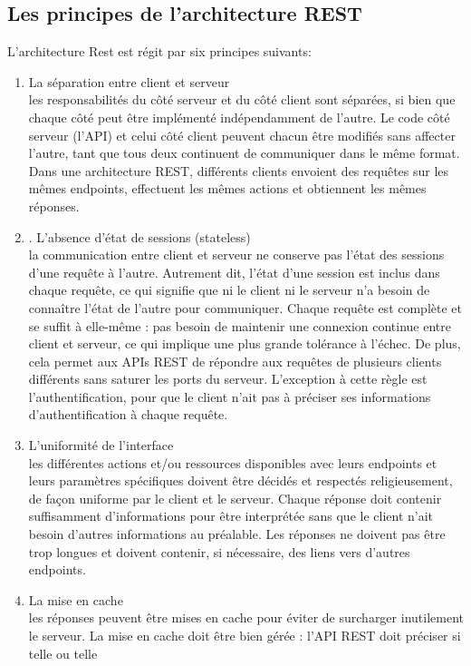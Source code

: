 \subsection{Les principes de l’architecture REST}
L'architecture Rest est régit par six principes suivants:
\begin{enumerate}
	\item La séparation entre client et serveur\\
les responsabilités du côté serveur et du côté client sont
séparées, si bien que chaque côté peut être implémenté indépendamment de l’autre. Le code
côté serveur (l’API) et celui côté client peuvent chacun être modifiés sans affecter l’autre, tant
que tous deux continuent de communiquer dans le même format. Dans une architecture REST,
différents clients envoient des requêtes sur les mêmes endpoints, effectuent les mêmes actions et
obtiennent les mêmes réponses.
     \item . L’absence d’état de sessions (stateless)\\
la communication entre client et serveur ne conserve pas
l’état des sessions d’une requête à l’autre. Autrement dit, l’état d’une session est inclus dans
chaque requête, ce qui signifie que ni le client ni le serveur n’a besoin de connaître l’état de
l’autre pour communiquer. Chaque requête est complète et se suffit à elle-même : pas besoin de maintenir une connexion continue entre client et serveur, ce qui implique une plus
grande tolérance à l’échec. De plus, cela permet aux APIs REST de répondre aux requêtes
de plusieurs clients différents sans saturer les ports du serveur. L’exception à cette règle est
l’authentification, pour que le client n’ait pas à préciser ses informations d’authentification à
chaque requête.
      \item L’uniformité de l’interface\\
les différentes actions et/ou ressources disponibles avec leurs endpoints et leurs paramètres spécifiques doivent être décidés et respectés religieusement, de façon
uniforme par le client et le serveur. Chaque réponse doit contenir suffisamment d’informations
pour être interprétée sans que le client n’ait besoin d’autres informations au préalable. Les
réponses ne doivent pas être trop longues et doivent contenir, si nécessaire, des liens vers d’autres
endpoints. 
       \item La mise en cache\\
les réponses peuvent être mises en cache pour éviter de surcharger inutilement le serveur. La mise en cache doit être bien gérée : l’API REST doit préciser si telle ou telle

\end{enumerate}
